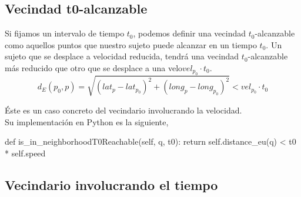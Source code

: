 \documentclass[a4paper, 12pt]{article}
\begin{document}
%
%
%
%
%
%

\subsection{Vecindad t0-alcanzable}

Si fijamos un intervalo de tiempo $t_0$, podemos definir una vecindad $t_0$-alcanzable como aquellos puntos que nuestro sujeto puede alcanzar en un tiempo $t_0$. Un sujeto que se desplace a velocidad reducida, tendr\'a una vecindad $t_0$-alcanzable m\'as reducido  que otro que se desplace a una velo$vel_{p_0}\cdot t_0$.  \\

$$ d_E(p_0, p) = \sqrt{(lat_{p} - lat_{p_0})^2 + (long_{p} - long_{p_0})^2 } < vel_{p_0} \cdot t_0 $$

\'Este es un caso concreto del vecindario involucrando la velocidad. \\


Su implementaci\'on en Python es la siguiente,\\

\begin{python}
        def is_in_neighborhoodT0Reachable(self, q, t0):
                return self.distance_eu(q) < t0 * self.speed
\end{python}

\subsection{Vecindario involucrando el tiempo}
\end{document}

